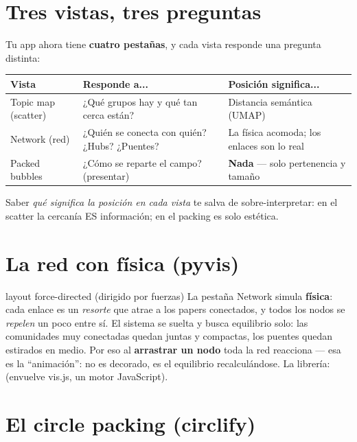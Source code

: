 \documentclass[11pt,a4paper]{article}
\begin{document}

\section{Tres vistas, tres preguntas}

Tu app ahora tiene \textbf{cuatro pestañas}, y cada vista responde una pregunta distinta:

\begin{center}
\begin{tabular}{lp{5.2cm}p{4.6cm}}
\textbf{Vista} & \textbf{Responde a...} & \textbf{Posición significa...} \\
\hline
Topic map (scatter) & ¿Qué grupos hay y qué tan cerca están? & Distancia semántica (UMAP) \\
Network (red) & ¿Quién se conecta con quién? ¿Hubs? ¿Puentes? & La física acomoda; los enlaces son lo real \\
Packed bubbles & ¿Cómo se reparte el campo? (presentar) & \textbf{Nada} — solo pertenencia y tamaño \\
\end{tabular}
\end{center}

Saber \emph{qué significa la posición en cada vista} te salva de sobre-interpretar: en el
scatter la cercanía ES información; en el packing es solo estética.

\section{La red con física (pyvis)}

\begin{concepto}{layout force-directed (dirigido por fuerzas)}
La pestaña Network simula \textbf{física}: cada enlace es un \emph{resorte} que atrae a los
papers conectados, y todos los nodos se \emph{repelen} un poco entre sí. El sistema se suelta
y busca equilibrio solo: las comunidades muy conectadas quedan juntas y compactas, los
puentes quedan estirados en medio. Por eso al \textbf{arrastrar un nodo} toda la red
reacciona — esa es la ``animación'': no es decorado, es el equilibrio recalculándose.
La librería:  (envuelve vis.js, un motor JavaScript).
\end{concepto}

\section{El circle packing (circlify)}
\end{document}

